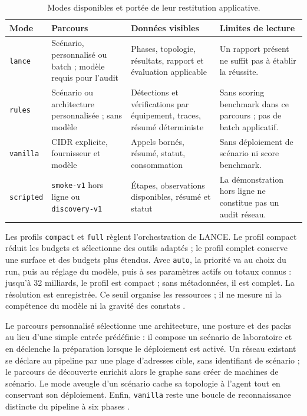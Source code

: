 \documentclass[11pt,a4paper]{article}
\begin{document}
\begin{table}[htbp]
\centering\small
\caption{Modes disponibles et portée de leur restitution applicative.}
\label{tab:application-modes}
\begin{tabularx}{\textwidth}{@{}>{\raggedright\arraybackslash}p{17mm}>{\raggedright\arraybackslash}p{31mm}YY@{}}
\toprule
Mode & Parcours & Données visibles & Limites de lecture \\
\midrule
\texttt{lance} & Scénario, personnalisé ou batch ; modèle requis pour l'audit &
Phases, topologie, résultats, rapport et évaluation applicable &
Un rapport présent ne suffit pas à établir la réussite. \\
\texttt{rules} & Scénario ou architecture personnalisée ; sans modèle &
Détections et vérifications par équipement, traces, résumé déterministe &
Sans scoring benchmark dans ce parcours ; pas de batch applicatif. \\
\texttt{vanilla} & CIDR explicite, fournisseur et modèle &
Appels bornés, résumé, statut, consommation &
Sans déploiement de scénario ni score benchmark. \\
\texttt{scripted} & \texttt{smoke-v1} hors ligne ou \texttt{discovery-v1} &
Étapes, observations disponibles, résumé et statut &
La démonstration hors ligne ne constitue pas un audit réseau. \\
\bottomrule
\end{tabularx}
\end{table}

Les profils \texttt{compact} et \texttt{full} règlent l'orchestration de LANCE.
Le profil compact réduit les budgets et sélectionne des outils adaptés ; le
profil complet conserve une surface et des budgets plus étendus. Avec
\texttt{auto}, la priorité va au choix du run, puis au réglage du modèle, puis
à ses paramètres actifs ou totaux connus : jusqu'à 32 milliards, le profil est
compact ; sans métadonnées, il est complet. La résolution est enregistrée.
Ce seuil organise les ressources ; il ne mesure ni la compétence du modèle
ni la gravité des constats \cite{arch-profils}.

Le parcours personnalisé sélectionne une architecture, une posture et des packs
au lieu d'une simple entrée prédéfinie : il compose un scénario de laboratoire
et en déclenche la préparation lorsque le déploiement est activé. Un réseau
existant se déclare au pipeline par une plage d'adresses cible, sans identifiant
de scénario ; le parcours de découverte enrichit alors le graphe sans créer
de machines de scénario. Le mode aveugle d'un scénario cache sa topologie à
l'agent tout en conservant son déploiement. Enfin, \texttt{vanilla} reste une
boucle de reconnaissance distincte du pipeline à six phases
\cite{arch-pipeline,app-modes,app-start}.
\end{document}
